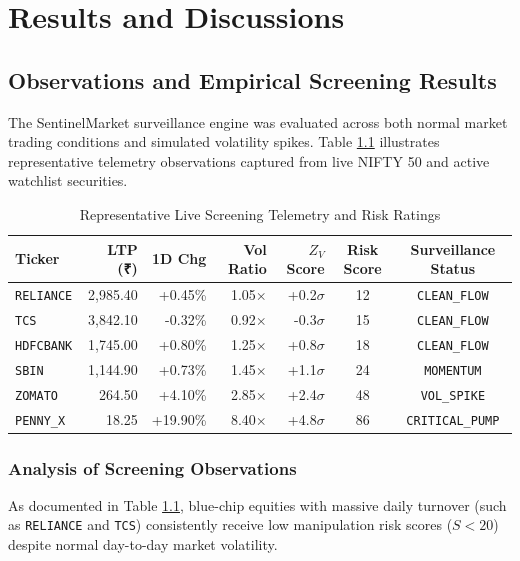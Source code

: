 \chapter{Results and Discussions}

\section{Observations and Empirical Screening Results}
The SentinelMarket surveillance engine was evaluated across both normal market trading conditions and simulated volatility spikes. Table \ref{tab:screening_results} illustrates representative telemetry observations captured from live NIFTY 50 and active watchlist securities.

\begin{table}[H]
\centering
\caption{Representative Live Screening Telemetry and Risk Ratings}
\label{tab:screening_results}
\begin{tabularx}{\textwidth}{@{}lrrrrcc@{}}
\toprule
\textbf{Ticker} & \textbf{LTP (₹)} & \textbf{1D Chg} & \textbf{Vol Ratio} & \textbf{$Z_V$ Score} & \textbf{Risk Score} & \textbf{Surveillance Status} \\
\midrule
\texttt{RELIANCE} & 2,985.40 & +0.45\% & 1.05$\times$ & +0.2$\sigma$ & 12 & \texttt{CLEAN\_FLOW} \\
\texttt{TCS}      & 3,842.10 & -0.32\% & 0.92$\times$ & -0.3$\sigma$ & 15 & \texttt{CLEAN\_FLOW} \\
\texttt{HDFCBANK} & 1,745.00 & +0.80\% & 1.25$\times$ & +0.8$\sigma$ & 18 & \texttt{CLEAN\_FLOW} \\
\texttt{SBIN}     & 1,144.90 & +0.73\% & 1.45$\times$ & +1.1$\sigma$ & 24 & \texttt{MOMENTUM} \\
\texttt{ZOMATO}   & 264.50   & +4.10\% & 2.85$\times$ & +2.4$\sigma$ & 48 & \texttt{VOL\_SPIKE} \\
\texttt{PENNY\_X} & 18.25    & +19.90\%& 8.40$\times$ & +4.8$\sigma$ & 86 & \texttt{CRITICAL\_PUMP} \\
\bottomrule
\end{tabularx}
\end{table}

\subsection{Analysis of Screening Observations}
As documented in Table \ref{tab:screening_results}, blue-chip equities with massive daily turnover (such as \texttt{RELIANCE} and \texttt{TCS}) consistently receive low manipulation risk scores ($S < 20$) despite normal day-to-day market volatility. 

